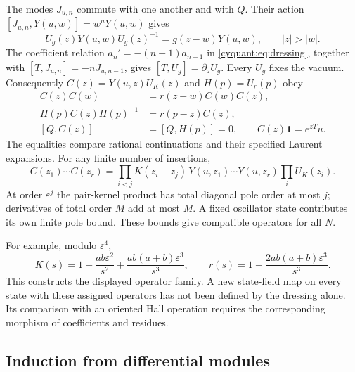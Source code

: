 The modes $J_{u,n}$ commute with one another and with $Q$.  Their action
$[J_{u,n},Y(u,w)]=w^nY(u,w)$ gives
\[
 U_g(z)Y(u,w)U_g(z)^{-1}=g(z-w)Y(u,w),\qquad |z|>|w|.
\]
The coefficient relation $a_n'=-(n+1)a_{n+1}$ in
\eqref{cyquant:eq:dressing}, together with
$[T,J_{u,n}]=-nJ_{u,n-1}$, gives $[T,U_g]=\partial_zU_g$.
Every $U_g$ fixes the vacuum.  Consequently
$C(z)=Y(u,z)U_K(z)$ and $H(p)=U_r(p)$ obey
\begin{equation}\label{cyquant:eq:nodal-exchange}
 \begin{aligned}
 C(z)C(w)&=r(z-w)C(w)C(z),\\
 H(p)C(z)H(p)^{-1}&=r(p-z)C(z),\\
 [Q,C(z)]&=[Q,H(p)]=0,\qquad C(z)\mathbf1=e^{zT}u.
 \end{aligned}
\end{equation}
The equalities compare rational continuations and their specified
Laurent expansions.  For any finite number of insertions,
\[
 C(z_1)\cdots C(z_r)=
 \prod_{i<j}K(z_i-z_j)\,
 Y(u,z_1)\cdots Y(u,z_r)\prod_iU_K(z_i).
\]
At order $\varepsilon^j$ the pair-kernel product has total diagonal
pole order at most $j$; derivatives of total order $M$ add at most
$M$.  A fixed oscillator state contributes its own finite pole bound.
These bounds give compatible operators for all $N$.

For example, modulo $\varepsilon^4$,
\[
 K(s)=1-\frac{ab\varepsilon^2}{s^2}
       +\frac{ab(a+b)\varepsilon^3}{s^3},\qquad
 r(s)=1+\frac{2ab(a+b)\varepsilon^3}{s^3}.
\]
This constructs the displayed operator family.  A new state-field map
on every state with these assigned operators has not been defined by
the dressing alone.  Its comparison with an oriented Hall operation
requires the corresponding morphism of coefficients and residues.

\subsection{Induction from differential modules}

